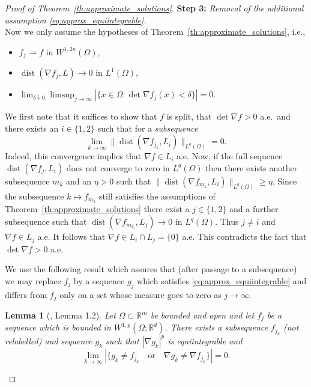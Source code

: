 \documentclass[titlepage]{amsart}
\numberwithin{equation}{section}
\theoremstyle{plain}
\newtheorem{lemma}[equation]{Lemma}
\theoremstyle{definition}
\theoremstyle{remark}
\newcommand{\dist}{\operatorname{dist}}
\newcommand{\R}{\mathbb{R}}
\newcommand{\g}{\nabla }
\begin{document}
\begin{proof}[Proof of Theorem~\ref{th:approximate_solutions}]
\medskip

 {\bf Step 3:}  \emph{Removal of the additional assumption  \eqref{eq:approx_equiintegrable}.}\\ 
 Now we only assume the hypotheses of Theorem~\ref{th:approximate_solutions}, i.e.,   
 \begin{itemize}
     \item $f_j \rightharpoonup f$ in $W^{1,2n}(\Omega)$,
     \item $\dist (\g f_j, L) \to 0$ in $L^1(\Omega)$,
     \item $\lim_{\delta \downarrow 0} \limsup_{j \to \infty}  | \{ x \in \Omega : \det \g f_j(x) < \delta \}| = 0$.
 \end{itemize} 
We first note that 
it suffices to show that $f$ is split, that $\det \g f > 0$ a.e.\ and there exists an $i \in \{1, 2\}$  such that for a {\it subsequence}
$$
\lim_{k \to \infty} \| \dist (\g f_{j_k}, L_i)\|_{L^q(\Omega)} = 0.
$$
Indeed,  this convergence implies that $\g f \in L_i$ a.e.
Now, if the full sequence $\dist(\g f_j,L_i)$ does not converge to zero in $L^q(\Omega)$ then there exists  another  subsequence 
$m_k$ and an $\eta > 0$ such that $\| \dist(\g f_{m_k}, L_i) \|_{L^q(\Omega)} \ge \eta$. Since the subsequence $k \mapsto f_{m_k}$
still satisfies the assumptions of Theorem~\ref{th:approximate_solutions} there exist a $j \in \{1,2\}$ and a further subsequence
such that $\dist(\g f_{m_{k_l}}, L_j) \to 0$ in $L^q(\Omega)$. Thus $j \ne i$ and $\g f \in L_j$ a.e.
It follows that $\g f \in L_i \cap L_j = \{0\}$ a.e. This contradicts the fact that $\det \g f > 0$ a.e.




We use the following result which assures that (after passage to a subsequence) we may replace $f_j$ by a
sequence $g_j$ which satisfies  \eqref{eq:approx_equiintegrable} and differs from $f_j$ only on  a set whose
measure goes to zero as $j \to \infty$. 




\begin{lemma}[\cite{fonseca_muller_pedregal98}, Lemma 1.2] 
\label{le:FMP}  Let $\Omega \subset \R^m$ be bounded and open and let  $f_j$ be a sequence which is bounded in $W^{1,p}(\Omega; \R^d)$. There exists a subsequence $f_{j_k}$  (not relabelled) and sequence $g_k$
such that $|\g g_k|^p$ is equiintegrable and
\begin{equation} 
\lim_{k \to \infty} | \{ g_k \ne f_{j_k} \quad \text{or} \quad \g g_k \ne \g f_{j_k} \}|  = 0.
\end{equation}
\end{lemma}


\end{proof}
\end{document}
